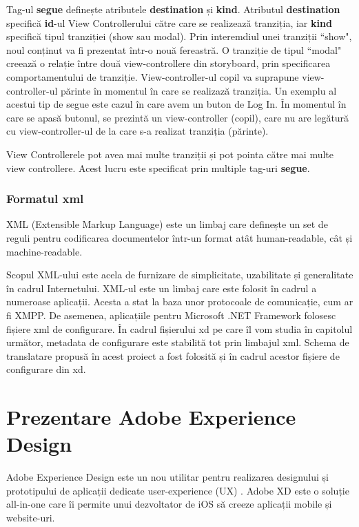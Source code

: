Tag-ul \textbf{segue} definește atributele \textbf{destination} și \textbf{kind}. Atributul \textbf{destination} specifică \textbf{id}-ul View Controllerului către care se realizează tranziția, iar \textbf{kind} specifică tipul tranziției (show sau modal). Prin interemdiul unei tranziții ``show", noul conținut va fi prezentat într-o nouă fereastră. O tranziție de tipul ``modal" creează o relație între două view-controllere din storyboard, prin specificarea comportamentului de tranziție. View-controller-ul copil va suprapune view-controller-ul părinte în momentul în care se realizază tranziția. Un exemplu al acestui tip de segue este cazul în care avem un buton de Log In. În momentul în care se apasă butonul, se prezintă un view-controller (copil), care nu are legătură cu view-controller-ul de la care s-a realizat tranziția (părinte). 

View Controllerele pot avea mai multe tranziții și pot pointa către mai multe view controllere. Acest lucru este specificat prin multiple tag-uri \textbf{segue}.

\subsubsection{Formatul xml}

XML (Extensible Markup Language) este un limbaj care definește un set de reguli pentru codificarea documentelor într-un format atât human-readable, cât și machine-readable. 

Scopul XML-ului este acela de furnizare de simplicitate, uzabilitate și generalitate în cadrul Internetului. XML-ul este un limbaj care este folosit în cadrul a numeroase aplicații. Acesta a stat la baza unor protocoale de comunicație, cum ar fi XMPP. De asemenea, aplicațiile pentru Microsoft .NET Framework folosesc fișiere xml de configurare. 
În cadrul fișierului xd pe care îl vom studia în capitolul următor, metadata de configurare este stabilită tot prin limbajul xml. Schema de translatare propusă în acest proiect a fost folosită și în cadrul acestor fișiere de configurare din xd.

\section{Prezentare Adobe Experience Design}

Adobe Experience Design este un nou utilitar pentru realizarea designului și prototipului de aplicații dedicate user-experience (UX) \cite{xd}. Adobe XD este o soluție all-in-one care îi permite unui dezvoltator de iOS să creeze aplicații mobile și website-uri. 

